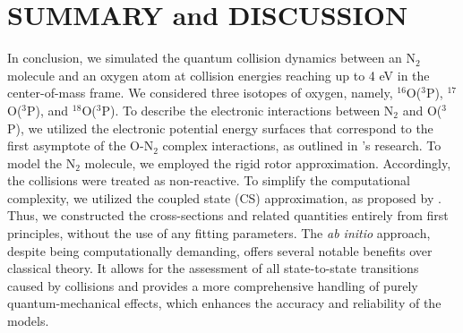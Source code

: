 \documentclass[fleqn,usenatbib]{mnras}
\begin{document}
\section{SUMMARY and DISCUSSION}
In conclusion, we simulated the quantum collision dynamics between an N$_2$ molecule and an oxygen atom at collision energies reaching up to 4 eV in the center-of-mass frame.  We considered three isotopes of oxygen, namely, $^{16}$O($^3$P), $^{17}$O($^3$P), and $^{18}$O($^3$P). To describe the electronic interactions between N$_2$ and O($^3$P), we utilized the electronic potential energy surfaces that correspond to the first asymptote of the O-N$_2$ complex interactions, as outlined in \cite{koner2020accurate}'s research. To model the N$_2$ molecule, we employed the rigid rotor approximation. Accordingly, the collisions were treated as non-reactive. To simplify the computational complexity, we utilized the coupled state (CS) approximation, as proposed by \cite{doi:10.1063/1.1681388}. Thus, we constructed the cross-sections and related quantities entirely from first principles, without the use of any fitting parameters. The \textit{ab initio} approach, despite being computationally demanding, offers several notable benefits over classical theory. It allows for the assessment of all state-to-state transitions caused by collisions and provides a more comprehensive handling of purely quantum-mechanical effects, which enhances the accuracy and reliability of the models. 
\end{document}

